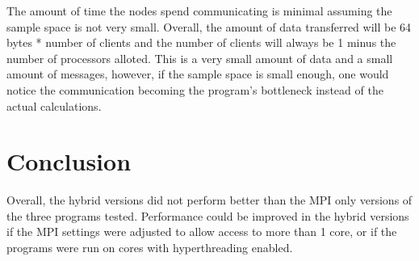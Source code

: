 \documentclass[notitlepage, letterpaper, 12pt]{report}
\begin{document}
The amount of time the nodes spend communicating is minimal assuming the sample space is not very small. Overall, the amount of data transferred will be 64 bytes * number of clients 
and the number of clients will always be 1 minus the number of processors alloted. This is a very small amount of data and a small amount of messages, however, if the sample space
is small enough, one would notice the communication becoming the program's bottleneck instead of the actual calculations. 

\section*{Conclusion}
Overall, the hybrid versions did not perform better than the MPI only versions of the three programs tested. Performance could be improved in the hybrid versions if the MPI settings
were adjusted to allow access to more than 1 core, or if the programs were run on cores with hyperthreading enabled. 

\newpage
\end{document}
